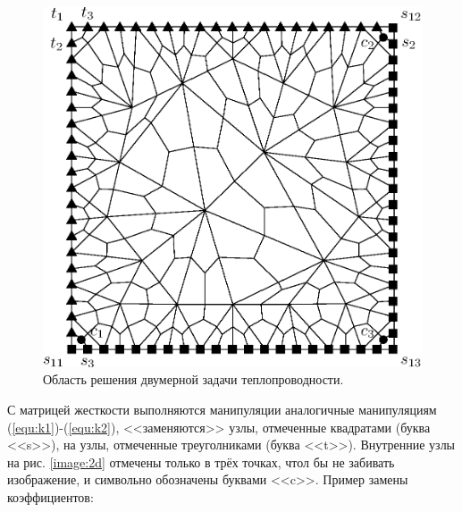 \begin{figure} [ht] 
    \center
    \includegraphics [scale=0.8] {images/2d}
    \caption{Область решения двумерной задачи теплопроводности.} 
    \label{images:2d}  
\end{figure}

С матрицей жесткости выполняются манипуляции аналогичные манипуляциям (\ref{equ:k1})-(\ref{equ:k2}), <<заменяются>> узлы, отмеченные квадратами (буква <<s>>),
на узлы, отмеченные треуголниками (буква <<t>>). Внутренние узлы на рис. \ref{image:2d} отмечены только в трёх точках, чтол бы не забивать изображение, и символьно обозначены буквами <<c>>.
Пример замены коэффициентов:



